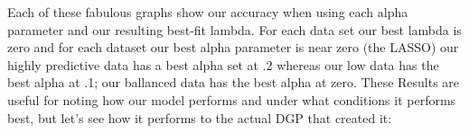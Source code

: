 \documentclass[12pt]{article}\usepackage[]{graphicx}\usepackage[]{color}
\makeatletter
\newcommand{\hlnum}[1]{\textcolor[rgb]{0.686,0.059,0.569}{#1}}%
\newcommand{\hlstr}[1]{\textcolor[rgb]{0.192,0.494,0.8}{#1}}%
\newcommand{\hlopt}[1]{\textcolor[rgb]{0,0,0}{#1}}%
\newcommand{\hlstd}[1]{\textcolor[rgb]{0.345,0.345,0.345}{#1}}%
\newcommand{\hlkwc}[1]{\textcolor[rgb]{0.333,0.667,0.333}{#1}}%
\newcommand{\hlkwd}[1]{\textcolor[rgb]{0.737,0.353,0.396}{\textbf{#1}}}%
\newenvironment{kframe}{%
 \def\at@end@of@kframe{}%
 \ifinner\ifhmode%
  \def\at@end@of@kframe{\end{minipage}}%
  \begin{minipage}{\columnwidth}%
 \fi\fi%
 \def\FrameCommand##1{\hskip\@totalleftmargin \hskip-\fboxsep
 \colorbox{shadecolor}{##1}\hskip-\fboxsep
     \hskip-\linewidth \hskip-\@totalleftmargin \hskip\columnwidth}%
 \MakeFramed {\advance\hsize-\width
   \@totalleftmargin\z@ \linewidth\hsize
   \@setminipage}}%
 {\par\unskip\endMakeFramed%
 \at@end@of@kframe}
\newenvironment{knitrout}{}{} %
\makeatother
\begin{document}
\begin{flushleft}

Each of these fabulous graphs show our accuracy when using each alpha parameter and our resulting best-fit lambda. For each data set our best lambda is zero and for each dataset our best alpha parameter is near zero (the LASSO) our highly predictive data has a best alpha set at .2 whereas our low data has the best alpha at .1; our ballanced data has the best alpha at zero. These Results are useful for noting how our model performs and under what conditions it performs best, but let's see how it performs to the actual DGP that created it:


\end{flushleft}
\end{document}
